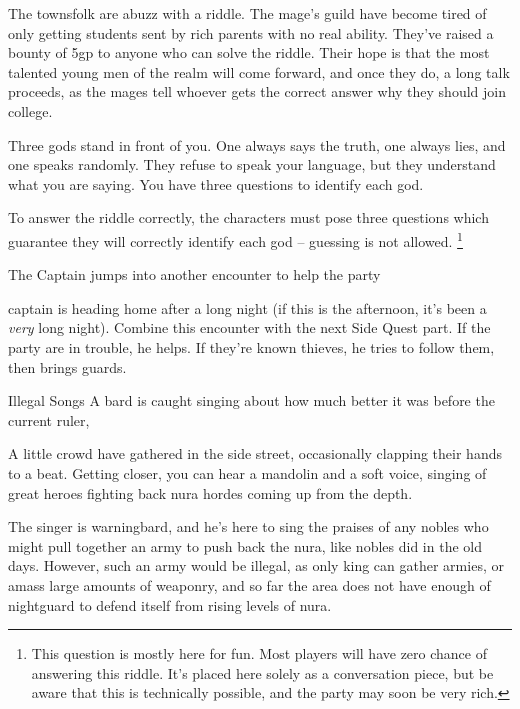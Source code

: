 \begin{multicols}{2}
The townsfolk are abuzz with a riddle.
The mage's guild have become tired of only getting students sent by rich parents with no real ability.
They've raised a bounty of 5gp to anyone who can solve the riddle.
Their hope is that the most talented young men of the realm will come forward, and once they do, a long talk proceeds, as the mages tell whoever gets the correct answer why they should join \gls{college}.

\begin{boxtext}
Three gods stand in front of you.  One always says the truth, one always lies, and one speaks randomly.  They refuse to speak your language, but they understand what you are saying.  You have three questions to identify each god.
\end{boxtext}

To answer the riddle correctly, the characters must pose three questions which guarantee they will correctly identify each god -- guessing is not allowed.
\footnote{This question is mostly here for fun.  Most players will have zero chance of answering this riddle.
It's placed here solely as a conversation piece, but be aware that this is technically possible, and the party may soon be very rich.}

{The Captain}%
{ jumps into another encounter to help the party}%

\captain

\Gls{captain} is heading home after a long night (if this is the afternoon, it's been a \emph{very} long night).
Combine this encounter with the next Side Quest part.
If the party are in trouble, he helps.
If they're known thieves, he tries to follow them, then brings guards.

{Illegal Songs}%
{A bard is caught singing about how much better it was before the current ruler, }%

\begin{boxtext}
	A little crowd have gathered in the side street, occasionally clapping their hands to a beat.
	Getting closer, you can hear a mandolin and a soft voice, singing of great heroes fighting back nura hordes coming up from the depth.
\end{boxtext}

The singer is \gls{warningbard}, and he's here to sing the praises of any nobles who might pull together an army to push back the nura, like nobles did in the old days.
However, such an army would be illegal, as only \gls{king} can gather armies, or amass large amounts of weaponry, and so far the area does not have enough of \gls{nightguard} to defend itself from rising levels of nura.


\end{multicols}
